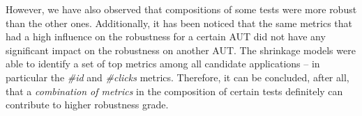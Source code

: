 However, we have also observed that compositions of some tests were more robust than the other ones. Additionally, it has been noticed that the same metrics that had a high influence on the robustness for a certain AUT did not have any significant impact on the robustness on another AUT. The shrinkage models were able to identify a set of top metrics among all candidate applications -- in particular the \textit{\#id} and \textit{\#clicks} metrics. Therefore, it can be concluded, after all, that a \textit{combination of metrics} in the composition of certain tests definitely can contribute to higher robustness grade.








 

